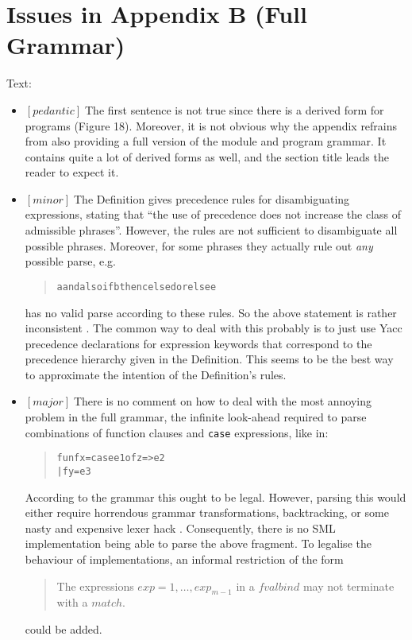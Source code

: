 \documentclass{article}
\newcommand{\m}[1]{$[\mathit{#1}]\;$}
\newcommand{\major}{\m{major}}
\newcommand{\minor}{\m{minor}}
\newcommand{\pedantic}{\m{pedantic}}
\begin{document}
\section{Issues in Appendix B (Full Grammar)}
\label{bugsappendixb}

Text:
\nopagebreak

\begin{itemize}
\item \pedantic The first sentence is not true since there is a derived form for programs (Figure 18). Moreover, it is not obvious why the appendix refrains from also providing a full version of the module and program grammar. It contains quite a lot of derived forms as well, and the section title leads the reader to expect it.

\item \minor The Definition gives precedence rules for disambiguating expressions, stating that ``the use of precedence does not increase the class of admissible phrases''. However, the rules are not sufficient to disambiguate all possible phrases. Moreover, for some phrases they actually rule out {\em any} possible parse, e.g.
\begin{quote}
\begin{alltt}
a andalso if b then c else d orelse e
\end{alltt}
\end{quote}
has no valid parse according to these rules. So the above statement is rather inconsistent \cite{mistakes}. The common way to deal with this probably is to just use Yacc precedence declarations for expression keywords that correspond to the precedence hierarchy given in the Definition. This seems to be the best way to approximate the intention of the Definition's rules.

\item \major There is no comment on how to deal with the most annoying problem in the full grammar, the infinite look-ahead required to parse combinations of function clauses and {\tt case} expressions, like in:
\begin{quote}
\begin{alltt}
fun f x = case e1 of z => e2
  | f y = e3
\end{alltt}
\end{quote}
According to the grammar this ought to be legal. However, parsing this would either require horrendous grammar transformations, backtracking, or some nasty and expensive lexer hack \cite{mistakes}. Consequently, there is no SML implementation being able to parse the above fragment. To legalise the behaviour of implementations, an informal restriction of the form
\begin{quote}
The expressions $\mathit{exp}=1,\dots,\mathit{exp}_{m-1}$ in a $\mathit{fvalbind}$ may not terminate with a $\mathit{match}$.
\end{quote}
could be added.
\end{itemize}
\end{document}
